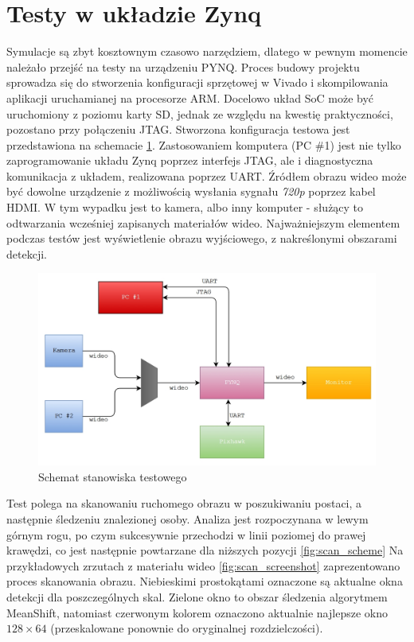 \section{Testy w układzie Zynq} %

Symulacje są zbyt kosztownym czasowo narzędziem, dlatego w pewnym momencie należało przejść na testy na urządzeniu PYNQ. 
Proces budowy projektu sprowadza się do stworzenia konfiguracji sprzętowej w Vivado i skompilowania aplikacji uruchamianej na procesorze ARM. %
Docelowo układ SoC może być uruchomiony z poziomu karty SD, jednak ze względu na kwestię praktyczności, pozostano przy połączeniu JTAG. 
Stworzona konfiguracja testowa jest przedstawiona na schemacie \ref{fig:testing_setup}. Zastosowaniem komputera (PC \#1) jest nie tylko zaprogramowanie układu Zynq poprzez interfejs JTAG, ale i diagnostyczna komunikacja z układem, realizowana poprzez UART. %
Źródłem obrazu wideo może być dowolne urządzenie z możliwością wysłania sygnału \textit{720p} poprzez kabel HDMI. W tym wypadku jest to kamera, albo inny komputer - służący to odtwarzania wcześniej zapisanych materiałów wideo. Najważniejszym elementem podczas testów jest wyświetlenie obrazu wyjściowego, z nakreślonymi obszarami detekcji.
\begin{figure}[h]
	\centering
	\includegraphics[width=14cm]{6_testing_setup.jpg}
	\caption{Schemat stanowiska testowego}
	\label{fig:testing_setup}
\end{figure}

Test polega na skanowaniu ruchomego obrazu w poszukiwaniu postaci, a następnie śledzeniu znalezionej osoby. Analiza jest rozpoczynana w lewym górnym rogu, po czym sukcesywnie przechodzi w linii poziomej do prawej krawędzi, co jest następnie powtarzane dla niższych pozycji \ref{fig:scan_scheme} %
Na przykładowych zrzutach z materiału wideo \ref{fig:scan_screenshot} zaprezentowano proces skanowania obrazu. 
Niebieskimi prostokątami oznaczone są aktualne okna detekcji dla poszczególnych skal. 
Zielone okno to obszar śledzenia algorytmem MeanShift, natomiast czerwonym kolorem oznaczono aktualnie najlepsze okno $128 \times 64$ (przeskalowane ponownie do oryginalnej rozdzielczości).

